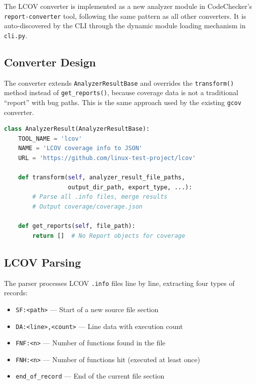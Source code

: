 The LCOV converter is implemented as a new analyzer module in CodeChecker's \texttt{report-converter} tool, following the same pattern as all other converters. It is auto-discovered by the CLI through the dynamic module loading mechanism in \texttt{cli.py}.

\subsection{Converter Design}

The converter extends \texttt{AnalyzerResultBase} and overrides the \texttt{transform()} method instead of \texttt{get\_reports()}, because coverage data is not a traditional ``report'' with bug paths. This is the same approach used by the existing \texttt{gcov} converter.

\begin{lstlisting}[language=Python, caption={LCOV converter class structure}]
class AnalyzerResult(AnalyzerResultBase):
    TOOL_NAME = 'lcov'
    NAME = 'LCOV coverage info to JSON'
    URL = 'https://github.com/linux-test-project/lcov'

    def transform(self, analyzer_result_file_paths,
                  output_dir_path, export_type, ...):
        # Parse all .info files, merge results
        # Output coverage/coverage.json

    def get_reports(self, file_path):
        return []  # No Report objects for coverage
\end{lstlisting}

\subsection{LCOV Parsing}

The parser processes LCOV \texttt{.info} files line by line, extracting four types of records:

\begin{itemize}
    \item \texttt{SF:<path>} --- Start of a new source file section
    \item \texttt{DA:<line>,<count>} --- Line data with execution count
    \item \texttt{FNF:<n>} --- Number of functions found in the file
    \item \texttt{FNH:<n>} --- Number of functions hit (executed at least once)
    \item \texttt{end\_of\_record} --- End of the current file section
\end{itemize}

